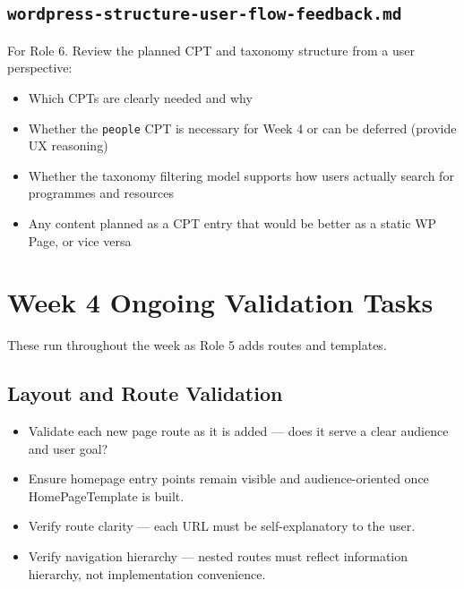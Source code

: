 \documentclass[12pt,a4paper]{article}
\begin{document}
\subsection{\texttt{wordpress-structure-user-flow-feedback.md}}

For Role 6. Review the planned CPT and taxonomy structure from a user perspective:

\begin{itemize}
    \item Which CPTs are clearly needed and why
    \item Whether the \texttt{people} CPT is necessary for Week 4 or can be deferred (provide UX reasoning)
    \item Whether the taxonomy filtering model supports how users actually search for programmes and resources
    \item Any content planned as a CPT entry that would be better as a static WP Page, or vice versa
\end{itemize}

\section{Week 4 Ongoing Validation Tasks}

These run throughout the week as Role 5 adds routes and templates.

\subsection{Layout and Route Validation}

\begin{itemize}
    \item[$\square$] Validate each new page route as it is added --- does it serve a clear audience and user goal?
    \item[$\square$] Ensure homepage entry points remain visible and audience-oriented once HomePageTemplate is built.
    \item[$\square$] Verify route clarity --- each URL must be self-explanatory to the user.
    \item[$\square$] Verify navigation hierarchy --- nested routes must reflect information hierarchy, not implementation convenience.
\end{itemize}
\end{document}
